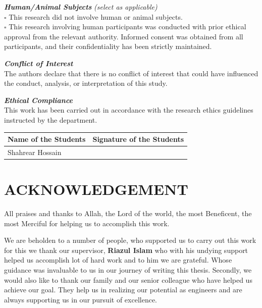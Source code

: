 \documentclass[12pt,a4paper,oneside]{report}
\begin{document}
\vspace{0.15cm}
\noindent\textbf{\textit{Human/Animal Subjects}} \textit{(select as applicable)}\\
$\square$ This research did not involve human or animal subjects.\\
$\square$ This research involving human participants was conducted with prior ethical approval from the relevant authority. Informed consent was obtained from all participants, and their confidentiality has been strictly maintained.

\vspace{0.15cm}
\noindent\textbf{\textit{Conflict of Interest}}\\
The authors declare that there is no conflict of interest that could have influenced the conduct, analysis, or interpretation of this study.

\vspace{0.15cm}
\noindent\textbf{\textit{Ethical Compliance}}\\
This work has been carried out in accordance with the research ethics guidelines instructed by the department.

\vspace{0.4cm}

\noindent\begin{tabular}{|>{\centering\arraybackslash}p{6.8cm}|>{\centering\arraybackslash}p{6.8cm}|}
\hline
\textbf{Name of the Students} & \textbf{Signature of the Students} \\
\hline
\rule{0pt}{1.0cm} Shahrear Hossain & \rule{0pt}{1.0cm} \\[0.3cm]
\hline
\end{tabular}

\clearpage


\chapter*{ACKNOWLEDGEMENT}

\noindent All praises and thanks to Allah, the Lord of the world, the most Beneficent, the most Merciful for helping us to accomplish this work.

\vspace{0.4cm}
\noindent We are beholden to a number of people, who supported us to carry out this work for this we thank our supervisor, \textbf{Riazul Islam} who with his undying support helped us accomplish lot of hard work and to him we are grateful. Whose guidance was invaluable to us in our journey of writing this thesis. Secondly, we would also like to thank our family and our senior colleague who have helped us achieve our goal. They help us in realizing our potential as engineers and are always supporting us in our pursuit of excellence.
\end{document}
